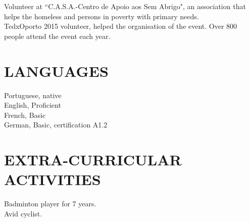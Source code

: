 \documentclass[margin, 10pt]{res} %
\begin{document}
\begin{resume}
    Volunteer at ``C.A.S.A.-Centro de Apoio aos Sem Abrigo", an association that helps the homeless and persons in poverty with primary needs.\\
    TedxOporto 2015 volunteer, helped the organisation of the event. Over 800 people attend the event each year.

    \section{LANGUAGES}
    Portuguese, native\\
    English, Proficient\\
    French, Basic\\
    German, Basic, certification A1.2


    \section{EXTRA-CURRICULAR \\ ACTIVITIES}
    Badminton player for 7 years.\\
    Avid cyclist.


\end{resume}
\end{document}
